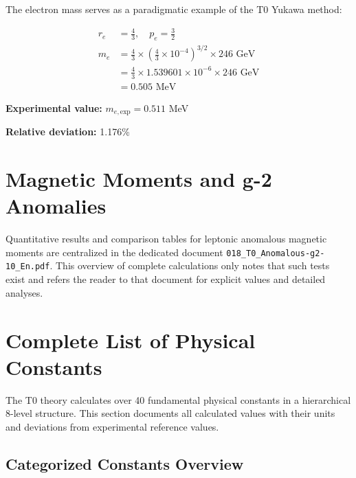 	The electron mass serves as a paradigmatic example of the T0 Yukawa method:
	
	\begin{align}
		r_e &= \frac{4}{3}, \quad p_e = \frac{3}{2} \\
		m_e &= \frac{4}{3} \times \left(\frac{4}{3} \times 10^{-4}\right)^{3/2} \times 246 \text{ GeV} \\
		&= \frac{4}{3} \times 1.539601 \times 10^{-6} \times 246 \text{ GeV} \\
		&= 0.505 \text{ MeV}
	\end{align}
	
	\textbf{Experimental value:} $m_{e,\text{exp}} = 0.511$ MeV
	
	\textbf{Relative deviation:} 1.176\%
	
	\section{Magnetic Moments and g-2 Anomalies}
	
	Quantitative results and comparison tables for leptonic anomalous magnetic moments are centralized in the dedicated document \texttt{018\_T0\_Anomalous-g2-10\_En.pdf}. This overview of complete calculations only notes that such tests exist and refers the reader to that document for explicit values and detailed analyses.
	
	\section{Complete List of Physical Constants}
	
	The T0 theory calculates over 40 fundamental physical constants in a hierarchical 8-level structure. This section documents all calculated values with their units and deviations from experimental reference values.
	
	\subsection{Categorized Constants Overview}
	
